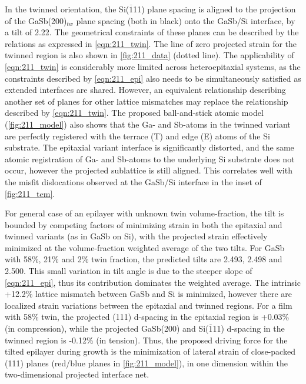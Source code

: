In the twinned orientation, the Si(\(\overline{1}\)11) plane spacing is aligned to the projection of the GaSb(200)\(_{tw}\) plane spacing (both in black) onto the GaSb/Si interface, by a tilt of 2.22\degree{}.
The geometrical constraints of these planes can be described by the relations as expressed in \cref{eqn:211_twin}.
The line of zero projected strain for the twinned region is also shown in \cref{fig:211_data} (dotted line).
The applicability of \cref{eqn:211_twin} is considerably more limited across heteroepitaxial systems, as the constraints described by \cref{eqn:211_epi} also needs to be simultaneously satisfied as extended interfaces are shared.
However, an equivalent relationship describing another set of planes for other lattice mismatches may replace the relationship described by \cref{eqn:211_twin}.
The proposed ball-and-stick atomic model (\cref{fig:211_model}) also shows that the Ga- and Sb-atoms in the twinned variant are perfectly registered with the terrace (T) and edge (E) atoms of the Si substrate.
The epitaxial variant interface is significantly distorted, and the same atomic registration of Ga- and Sb-atoms to the underlying Si substrate does not occur, however the projected sublattice is still aligned.
This correlates well with the misfit dislocations observed at the GaSb/Si interface in the inset of \cref{fig:211_tem}.

For general case of an epilayer with unknown twin volume-fraction, the tilt is bounded by competing factors of minimizing strain in both the epitaxial and twinned variants (as in GaSb on Si), with the projected strain effectively minimized at the volume-fraction weighted average of the two tilts.
For GaSb with 58\%, 21\% and 2\% twin fraction, the predicted tilts are 2.493\degree{}, 2.498\degree{} and 2.500\degree{}.
This small variation in tilt angle is due to the steeper slope of \cref{eqn:211_epi}, thus its contribution dominates the weighted average.
The intrinsic +12.2\% lattice mismatch between GaSb and Si is minimized, however there are localized strain variations between the epitaxial and twinned regions.
For a film with 58\% twin, the projected (111) d-spacing in the epitaxial region is +0.03\% (in compression), while the projected GaSb(200) and Si(\(\overline{1}\)11) d-spacing in the twinned region is -0.12\% (in tension).
Thus, the proposed driving force for the tilted epilayer during growth is the minimization of lateral strain of close-packed (111) planes (red/blue planes in \cref{fig:211_model}), in one dimension within the two-dimensional projected interface net.

